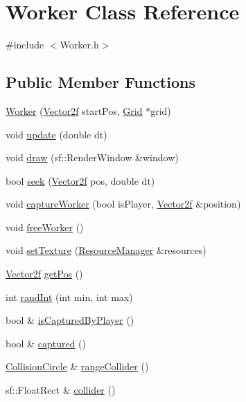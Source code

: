 \hypertarget{class_worker}{}\section{Worker Class Reference}
\label{class_worker}


{\ttfamily \#include $<$Worker.\+h$>$}

\subsection*{Public Member Functions}
\begin{DoxyCompactItemize}
\item 
\mbox{\hyperlink{class_worker_a86e97bdd2d5ed06f8a997e8c1f2e4521}{Worker}} (\mbox{\hyperlink{class_vector2f}{Vector2f}} start\+Pos, \mbox{\hyperlink{class_grid}{Grid}} $\ast$grid)
\item 
void \mbox{\hyperlink{class_worker_a24d77fb819f45f812eb7816cc990d0a8}{update}} (double dt)
\item 
void \mbox{\hyperlink{class_worker_a2724bde59b7eb0de17835e8cb836d9e4}{draw}} (sf\+::\+Render\+Window \&window)
\item 
bool \mbox{\hyperlink{class_worker_a8a08fc9cd6b5c037bbb5313c60e704fb}{seek}} (\mbox{\hyperlink{class_vector2f}{Vector2f}} pos, double dt)
\item 
void \mbox{\hyperlink{class_worker_af231e1b5014b6c7904c59ed266b5799b}{capture\+Worker}} (bool is\+Player, \mbox{\hyperlink{class_vector2f}{Vector2f}} \&position)
\item 
void \mbox{\hyperlink{class_worker_afdf9ffac28bf4e7f33664e453ac83738}{free\+Worker}} ()
\item 
void \mbox{\hyperlink{class_worker_a691198ec4ce808be111c14289f9fdb89}{set\+Texture}} (\mbox{\hyperlink{class_resource_manager}{Resource\+Manager}} \&resources)
\item 
\mbox{\hyperlink{class_vector2f}{Vector2f}} \mbox{\hyperlink{class_worker_a03c37b6ee9d3b5160a91f6f614b90b06}{get\+Pos}} ()
\item 
int \mbox{\hyperlink{class_worker_aaaa7317cbc70e298aa48b8fc9dc2e1b1}{rand\+Int}} (int min, int max)
\item 
bool \& \mbox{\hyperlink{class_worker_a86655858aff676a8158887207b2e810c}{is\+Captured\+By\+Player}} ()
\item 
bool \& \mbox{\hyperlink{class_worker_ae5d7ebf96509f20ce340a4f22b316687}{captured}} ()
\item 
\mbox{\hyperlink{class_collision_circle}{Collision\+Circle}} \& \mbox{\hyperlink{class_worker_a36782d25fae56d7bfcdc9c5233573a54}{range\+Collider}} ()
\item 
sf\+::\+Float\+Rect \& \mbox{\hyperlink{class_worker_a2b15396b9a09e43fc87efeea650d416a}{collider}} ()
\end{DoxyCompactItemize}


